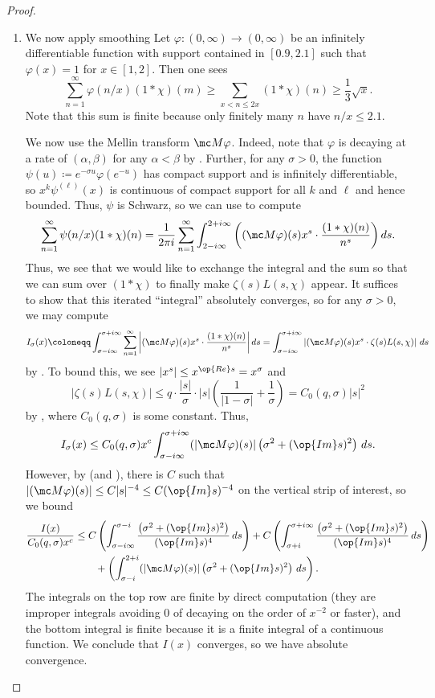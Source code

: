 \documentclass[../notes.tex]{subfiles}
\begin{document}
\begin{proof}
\begin{enumerate}
		\item We now apply smoothing Let $\varphi\colon(0,\infty)\to(0,\infty)$ be an infinitely differentiable function with support contained in $[0.9,2.1]$ such that $\varphi(x)=1$ for $x\in[1,2]$. Then one sees
		\[\sum_{n=1}^\infty\varphi(n/x)(1*\chi)(m)\ge\sum_{x<n\le2x}(1*\chi)(n)\ge\frac13\sqrt x.\]
		Note that this sum is finite because only finitely many $n$ have $n/x\le2.1$.
	
		We now use the Mellin transform $\mc M\varphi$. Indeed, note that $\varphi$ is decaying at a rate of $(\alpha,\beta)$ for any $\alpha<\beta$ by . Further, for any $\sigma>0$, the function $\psi(u)\coloneqq e^{-\sigma u}\varphi\left(e^{-u}\right)$ has compact support and is infinitely differentiable, so $x^k\psi^{(\ell)}(x)$ is continuous of compact support for all $k$ and $\ell$ and hence bounded. Thus, $\psi$ is Schwarz, so we can use  to compute
		\[\sum_{n=1}^\infty\psi(n/x)(1*\chi)(n)=\frac1{2\pi i}\sum_{n=1}^\infty\int_{2-i\infty}^{2+i\infty}\left((\mc M\varphi)(s)x^{s}\cdot\frac{(1*\chi)(n)}{n^s}\right)ds.\]
		Thus, we see that we would like to exchange the integral and the sum so that we can sum over $(1*\chi)$ to finally make $\zeta(s)L(s,\chi)$ appear. It suffices to show that this iterated ``integral'' absolutely converges, so for any $\sigma>0$, we may compute
		\[I_\sigma(x)\coloneqq\int_{\sigma-i\infty}^{\sigma+i\infty}\sum_{n=1}^\infty\left|(\mc M\varphi)(s)x^{s}\cdot\frac{(1*\chi)(n)}{n^s}\right|ds=\int_{\sigma-i\infty}^{\sigma+i\infty}\left|(\mc M\varphi)(s)x^s\cdot\zeta(s)L(s,\chi)\right|\,ds\]
		by . To bound this, we see $\left|x^s\right|\le x^{\op{Re}s}=x^\sigma$ and
		\[|\zeta(s)L(s,\chi)|\le q\cdot\frac{|s|}\sigma\cdot|s|\left(\frac1{|1-\sigma|}+\frac1\sigma\right)=C_0(q,\sigma)|s|^2\]
		by , where $C_0(q,\sigma)$ is some constant. Thus,
		\[I_\sigma(x)\le C_0(q,\sigma)x^c\int_{\sigma-i\infty}^{\sigma+i\infty}(|\mc M\varphi)(s)|\left(\sigma^2+(\op{Im}s)^2\right)\,ds.\]
		However, by  (and ), there is $C$ such that $|(\mc M\varphi)(s)|\le C|s|^{-4}\le C(\op{Im}s)^{-4}$ on the vertical strip of interest, so we bound
		\begin{align*}
			\frac{I(x)}{C_0(q,\sigma)x^c} &\le 
			C\left(\int_{\sigma-i\infty}^{\sigma-i}\frac{\left(\sigma^2+(\op{Im}s)^2\right)}{(\op{Im}s)^4}\,ds\right)
			+C\left(\int_{\sigma+i}^{\sigma+i\infty}\frac{\left(\sigma^2+(\op{Im}s)^2\right)}{(\op{Im}s)^4}\,ds\right) \\
			&\qquad+\left(\int_{\sigma-i}^{2+i}(|\mc M\varphi)(s)|\left(\sigma^2+(\op{Im}s)^2\right)\,ds\right).
		\end{align*}
		The integrals on the top row are finite by direct computation (they are improper integrals avoiding $0$ of decaying on the order of $x^{-2}$ or faster), and the bottom integral is finite because it is a finite integral of a continuous function. We conclude that $I(x)$ converges, so we have absolute convergence.
		

\end{enumerate}
\end{proof}
\end{document}
